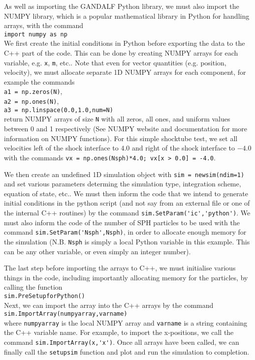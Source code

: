 \documentclass[a4paper]{article}
\newcommand{\var}[1]{\texttt{#1}}
\newcommand{\singlecommand}[1]{\\ \newline \indent \var{#1} \\ \newline \noindent}
\begin{document}




\noindent As well as importing the GANDALF Python library, we must also import the NUMPY library, which is a popular mathematical library in Python for handling arrays, with the command \singlecommand{import numpy as np}
We first create the initial conditions in Python before exporting the data to the C++ part of the code.  This can be done by creating NUMPY arrays for each variable, e.g. \var{x}, \var{m}, etc..  Note that even for vector quantities (e.g. position, velocity), we must allocate separate 1D NUMPY arrays for each component, for example the commands \\
\newline
\indent \lstinline{a1 = np.zeros(N)}, \\
\indent \lstinline{a2 = np.ones(N)}, \\
\indent \lstinline{a3 = np.linspace(0.0,1.0,num=N)} \\
\newline
return NUMPY arrays of size \var{N} with all zeros, all ones, and uniform values between 0 and 1 respectively  (See NUMPY website and documentation for more information on NUMPY functions).  For this simple shocktube test, we set all velocities left of the shock interface to $4.0$ and right of the shock interface to $-4.0$ with the commands \lstinline{vx = np.ones(Nsph)*4.0; vx[x > 0.0] = -4.0}.

We then create an undefined 1D simulation object with \lstinline{sim = newsim(ndim=1)} and set various parameters determing the simulation type, integration scheme, equation of state, etc..  We must then inform the code that we intend to generate initial conditions in the python script (and not say from an external file or one of the internal C++ routines) by the command \lstinline{sim.SetParam('ic','python')}.  We must also inform the code of the number of SPH particles to be used with the command \lstinline{sim.SetParam('Nsph',Nsph)}, in order to allocate enough memory for the simulation (N.B. \var{Nsph} is simply a local Python variable in this example.  This can be any other variable, or even simply an integer number).

The last step before importing the arrays to C++, we must initialise various things in the code, including importantly allocating memory for the particles, by calling the function \singlecommand{sim.PreSetupforPython()}
Next, we can import the array into the C++ arrays by the command \singlecommand{sim.ImportArray(numpyarray,varname)}
where \var{numpyarray} is the local NUMPY array and \var{varname} is a string containing the C++ variable name.  For example, to import the x-positions, we call the command \lstinline{sim.ImportArray(x,'x')}.  Once all arrays have been called, we can finally call the \var{setupsim} function and plot and run the simulation to completion.
\end{document}

